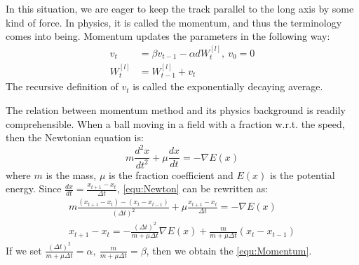 In this situation, we are eager to keep the track
parallel to the long axis by some kind of force. In physics, it is called
the momentum, and thus the terminology comes into being. Momentum updates
the parameters in the following way:
\begin{equation}
    \label{equ:Momentum}
    \begin{split}
        v_{t} & = \beta v_{t-1} - \alpha dW_t^{[l]},\ v_0 = 0 \\
        W_t^{[l]} & = W_{t-1}^{[l]} + v_{t}
    \end{split}
\end{equation}
The recursive definition of $ v_t $ is called the exponentially decaying average.
\par The relation between momentum method and its physics background is readily
comprehensible. When a ball moving in a field with
a fraction w.r.t. the speed, then the Newtonian equation is:
\begin{equation}
    \label{equ:Newton}
    m\frac{d^2x}{dt^2} + \mu\frac{dx}{dt} = -\nabla E(x)
\end{equation}
where $ m $ is the mass, $ \mu $ is the fraction coefficient and $ E(x) $
is the potential energy. Since 
$ \frac{dx}{dt} = \frac{x_{t+1} - x_{t}}{\Delta t} $, \autoref{equ:Newton}
can be rewritten as:
\begin{equation}
    \label{equ:physics}
    \begin{split}
        m\frac{(x_{t+1} - x_{t}) - (x_{t} - x_{t-1})}{(\Delta t)^2} + \mu\frac{x_{t+1} - x_{t}}{\Delta t} = -\nabla E(x) \\
        x_{t+1} - x_{t} = -\frac{(\Delta t)^2}{m+\mu\Delta t}\nabla E(x) + \frac{m}{m+\mu\Delta t}(x_{t} - x_{t-1})
    \end{split}
\end{equation}
If we set $ \frac{(\Delta t)^2}{m+\mu\Delta t} = \alpha,\ 
\frac{m}{m+\mu\Delta t} = \beta $, then we obtain the \autoref{equ:Momentum}.

